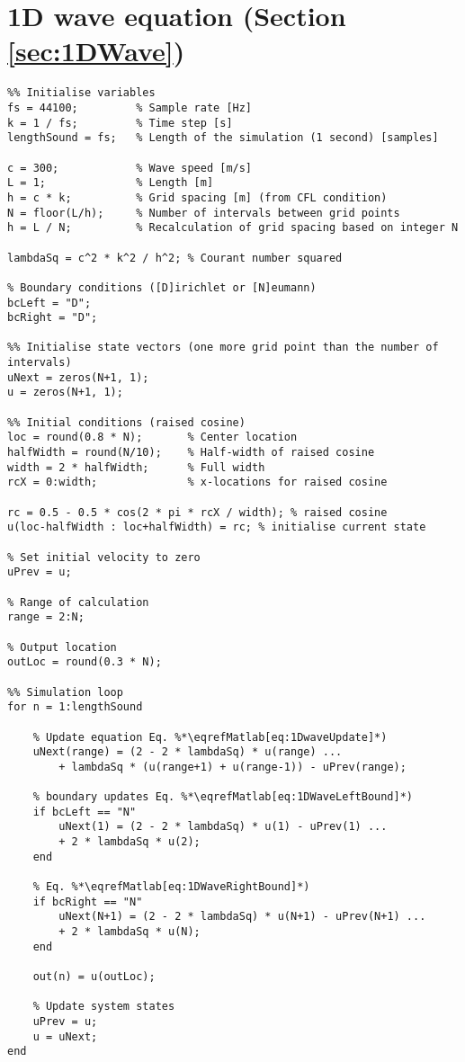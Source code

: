 \section{1D wave equation (Section \ref{sec:1DWave})}
\label{app:1DWave}
\begin{lstlisting}
%% Initialise variables
fs = 44100;         % Sample rate [Hz]
k = 1 / fs;         % Time step [s]
lengthSound = fs;   % Length of the simulation (1 second) [samples]             

c = 300;            % Wave speed [m/s]
L = 1;              % Length [m]
h = c * k;          % Grid spacing [m] (from CFL condition)
N = floor(L/h);     % Number of intervals between grid points
h = L / N;          % Recalculation of grid spacing based on integer N

lambdaSq = c^2 * k^2 / h^2; % Courant number squared

% Boundary conditions ([D]irichlet or [N]eumann)
bcLeft = "D";            
bcRight = "D"; 

%% Initialise state vectors (one more grid point than the number of intervals)
uNext = zeros(N+1, 1); 
u = zeros(N+1, 1);

%% Initial conditions (raised cosine)
loc = round(0.8 * N);       % Center location
halfWidth = round(N/10);    % Half-width of raised cosine
width = 2 * halfWidth;      % Full width
rcX = 0:width;              % x-locations for raised cosine

rc = 0.5 - 0.5 * cos(2 * pi * rcX / width); % raised cosine
u(loc-halfWidth : loc+halfWidth) = rc; % initialise current state  

% Set initial velocity to zero
uPrev = u;

% Range of calculation 
range = 2:N;

% Output location
outLoc = round(0.3 * N);

%% Simulation loop
for n = 1:lengthSound
    
    % Update equation Eq. %*\eqrefMatlab[eq:1DwaveUpdate]*)
    uNext(range) = (2 - 2 * lambdaSq) * u(range) ...
        + lambdaSq * (u(range+1) + u(range-1)) - uPrev(range); 
    
    % boundary updates Eq. %*\eqrefMatlab[eq:1DWaveLeftBound]*)
    if bcLeft == "N"
        uNext(1) = (2 - 2 * lambdaSq) * u(1) - uPrev(1) ...
        + 2 * lambdaSq * u(2); 
    end

    % Eq. %*\eqrefMatlab[eq:1DWaveRightBound]*)
    if bcRight == "N"
        uNext(N+1) = (2 - 2 * lambdaSq) * u(N+1) - uPrev(N+1) ...
        + 2 * lambdaSq * u(N); 
    end
    
    out(n) = u(outLoc);
    
    % Update system states
    uPrev = u;
    u = uNext;
end
\end{lstlisting}


